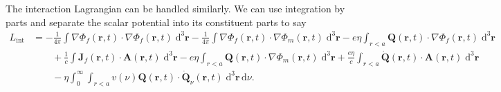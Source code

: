 \documentclass{article}
\begin{document}
The interaction Lagrangian can be handled similarly. We can use integration by parts and separate the scalar potential into its constituent parts to say
\begin{equation}
\begin{split}
L_\mathrm{int} &=
-\frac{1}{4\pi}\int\nabla\Phi_f(\mathbf{r},t)\cdot\nabla\Phi_f(\mathbf{r},t)\;\mathrm{d}^3\mathbf{r} - \frac{1}{4\pi}\int\nabla\Phi_f(\mathbf{r},t)\cdot\nabla\Phi_m(\mathbf{r},t)\;\mathrm{d}^3\mathbf{r} - e\eta\int_{r<a}\mathbf{Q}(\mathbf{r},t)\cdot\nabla\Phi_f(\mathbf{r},t)\;\mathrm{d}^3\mathbf{r}\\
&\qquad + \frac{1}{c}\int\mathbf{J}_f(\mathbf{r},t)\cdot\mathbf{A}(\mathbf{r},t)\;\mathrm{d}^3\mathbf{r} - e\eta\int_{r<a}\mathbf{Q}(\mathbf{r},t)\cdot\nabla\Phi_m(\mathbf{r},t)\;\mathrm{d}^3\mathbf{r} + \frac{e\eta}{c}\int_{r<a}\dot{\mathbf{Q}}(\mathbf{r},t)\cdot\mathbf{A}(\mathbf{r},t)\;\mathrm{d}^3\mathbf{r}\\
&\qquad - \eta\int_0^\infty\int_{r < a} v(\nu)\mathbf{Q}(\mathbf{r},t)\cdot\dot{\mathbf{Q}}_\nu(\mathbf{r},t)\;\mathrm{d}^3\mathbf{r}\,\mathrm{d}\nu.\\
\end{split}
\end{equation}
\end{document}
